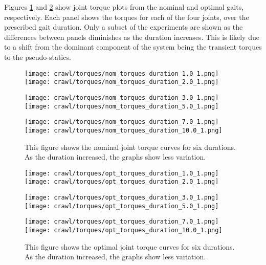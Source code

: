Figures \ref{fig:vrep_nom_joint_torques_by_duration1} and \ref{fig:vrep_opt_joint_torques_by_duration1}
show joint torque plots from the nominal and optimal gaits, respectively.
Each panel shows the torques for each of the four joints, over the prescribed gait duration.
Only a subset of the experiments are shown as the differences between panels diminishes
as the duration increases. This is likely due to a shift from the dominant component 
of the system being the transient torques to the pseudo-statics.

\begin{figure}
  \centerline{
    \texttt{[image: crawl/torques/nom\_torques\_duration\_1.0\_1.png]}
    \texttt{[image: crawl/torques/nom\_torques\_duration\_2.0\_1.png]}
  }
  \centerline{
    \texttt{[image: crawl/torques/nom\_torques\_duration\_3.0\_1.png]}
    \texttt{[image: crawl/torques/nom\_torques\_duration\_5.0\_1.png]}
  }
  \centerline{
    \texttt{[image: crawl/torques/nom\_torques\_duration\_7.0\_1.png]}
    \texttt{[image: crawl/torques/nom\_torques\_duration\_10.0\_1.png]}
  }
  \caption{This figure shows the nominal joint torque curves for six durations.
           As the duration increased, the graphs show less variation.}
  \label{fig:vrep_nom_joint_torques_by_duration1}
\end{figure}

\begin{figure}
  \centerline{
    \texttt{[image: crawl/torques/opt\_torques\_duration\_1.0\_1.png]}
    \texttt{[image: crawl/torques/opt\_torques\_duration\_2.0\_1.png]}
  }
  \centerline{
    \texttt{[image: crawl/torques/opt\_torques\_duration\_3.0\_1.png]}
    \texttt{[image: crawl/torques/opt\_torques\_duration\_5.0\_1.png]}
  }
  \centerline{
    \texttt{[image: crawl/torques/opt\_torques\_duration\_7.0\_1.png]}
    \texttt{[image: crawl/torques/opt\_torques\_duration\_10.0\_1.png]}
  }
  \caption{This figure shows the optimal joint torque curves for six durations.
           As the duration increased, the graphs show less variation.}
  \label{fig:vrep_opt_joint_torques_by_duration1}
\end{figure}

